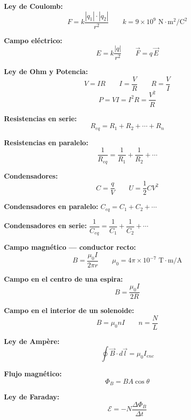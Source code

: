 \begin{nota}
\textbf{Ley de Coulomb:}
$$F = k \frac{|q_1| \cdot |q_2|}{r^2} \qquad k = 9 \times 10^9 \text{ N}\cdot\text{m}^2/\text{C}^2$$

\vspace{0.3cm}

\textbf{Campo eléctrico:}
$$E = k \frac{|q|}{r^2} \qquad \vec{F} = q\,\vec{E}$$

\vspace{0.3cm}

\textbf{Ley de Ohm y Potencia:}
$$V = IR \qquad I = \frac{V}{R} \qquad R = \frac{V}{I}$$
$$P = VI = I^2 R = \frac{V^2}{R}$$

\vspace{0.3cm}

\textbf{Resistencias en serie:}
$$R_{eq} = R_1 + R_2 + \cdots + R_n$$

\textbf{Resistencias en paralelo:}
$$\frac{1}{R_{eq}} = \frac{1}{R_1} + \frac{1}{R_2} + \cdots$$

\vspace{0.3cm}

\textbf{Condensadores:}
$$C = \frac{q}{V} \qquad U = \frac{1}{2}CV^2$$

\textbf{Condensadores en paralelo:} $C_{eq} = C_1 + C_2 + \cdots$

\textbf{Condensadores en serie:} $\dfrac{1}{C_{eq}} = \dfrac{1}{C_1} + \dfrac{1}{C_2} + \cdots$

\vspace{0.3cm}

\textbf{Campo magnético — conductor recto:}
$$B = \frac{\mu_0 I}{2\pi r} \qquad \mu_0 = 4\pi \times 10^{-7} \text{ T}\cdot\text{m/A}$$

\textbf{Campo en el centro de una espira:}
$$B = \frac{\mu_0 I}{2R}$$

\textbf{Campo en el interior de un solenoide:}
$$B = \mu_0 n I \qquad n = \frac{N}{L}$$

\vspace{0.3cm}

\textbf{Ley de Ampère:}
$$\oint \vec{B} \cdot d\vec{l} = \mu_0 I_{enc}$$

\vspace{0.3cm}

\textbf{Flujo magnético:}
$$\Phi_B = B A \cos\theta$$

\textbf{Ley de Faraday:}
$$\mathcal{E} = -N\frac{\Delta\Phi_B}{\Delta t}$$
\end{nota}